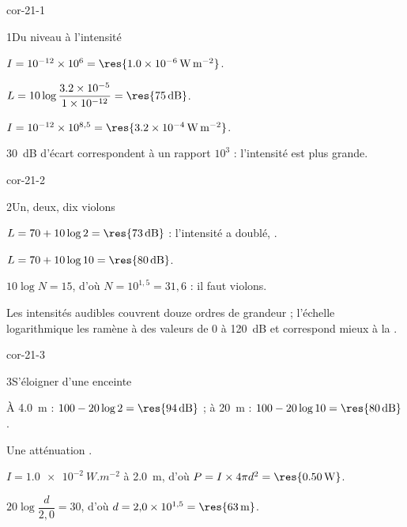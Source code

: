 \corrigesSouples

\begin{blocLivre}{cor-21-1}
\begin{corrige}{1}{Du niveau à l'intensité}
\begin{questions}
\item $I=10^{-12}\times10^{6}=\res{\qty{1,0e-6}{W.m^{-2}}}$.
\item $L=10\log\dfrac{\num{3.2e-5}}{\num{1e-12}}=\res{\qty{75}{dB}}$.
\item $I=10^{-12}\times10^{8{,}5}=\res{\qty{3,2e-4}{W.m^{-2}}}$.
\item $30$~dB d'écart correspondent à un rapport $10^{3}$ : l'intensité est  plus grande.
\end{questions}
\end{corrige}
\end{blocLivre}
\begin{blocLivre}{cor-21-2}
\begin{corrige}{2}{Un, deux, dix violons}
\begin{questions}
\item $L=70+10\log2=\res{\qty{73}{dB}}$ : l'intensité a doublé, .
\item $L=70+10\log10=\res{\qty{80}{dB}}$.
\item $10\log N=15$, d'où $N=10^{1{,}5}=31{,}6$ : il faut  violons.
\item Les intensités audibles couvrent douze ordres de grandeur ; l'échelle logarithmique les ramène à des valeurs de
0 à \qty{120}{dB} et correspond mieux à la .
\end{questions}
\end{corrige}
\end{blocLivre}
\begin{blocLivre}{cor-21-3}
\begin{corrige}{3}{S'éloigner d'une enceinte}
\begin{questions}
\item À \qty{4,0}{m} : $100-20\log2=\res{\qty{94}{dB}}$ ; à \qty{20}{m} : $100-20\log10=\res{\qty{80}{dB}}$.
\item Une atténuation .
\item $I=\qty{1,0e-2}{W.m^{-2}}$ à \qty{2,0}{m}, d'où $P=I\times4\pi d^2=\res{\qty{0,50}{W}}$.
\item $20\log\dfrac{d}{2{,}0}=30$, d'où $d=2{,}0\times10^{1{,}5}=\res{\qty{63}{m}}$.
\end{questions}
\end{corrige}
\end{blocLivre}
